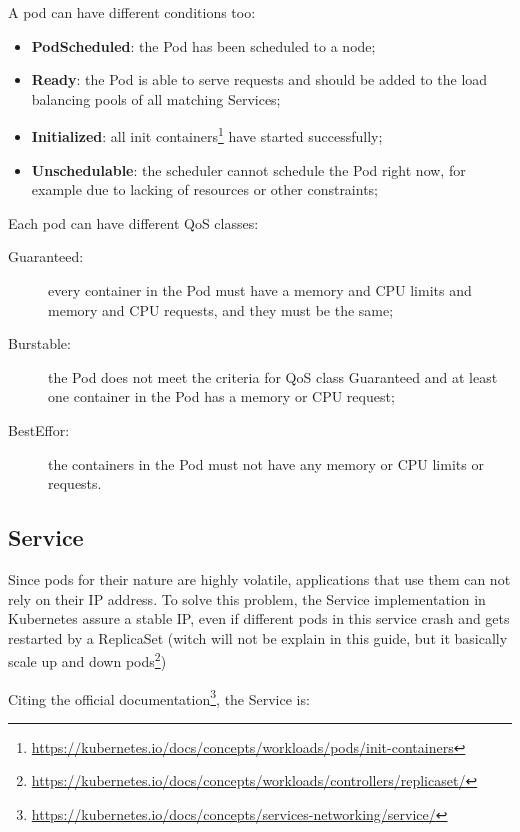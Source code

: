 A pod can have different conditions too:
\begin{itemize}
\item \textbf{PodScheduled}: the Pod has been scheduled to a node;
\item \textbf{Ready}: the Pod is able to serve requests and should be added
  to the load balancing pools of all matching Services;
\item \textbf{Initialized}: all init containers\footnote{
  \url{https://kubernetes.io/docs/concepts/workloads/pods/init-containers}}
  have started successfully;
\item \textbf{Unschedulable}: the scheduler cannot schedule the Pod right
  now, for example due to lacking of resources or other constraints;
\end{itemize}

Each pod can have different QoS classes:
\begin{description}
  \item [Guaranteed:] every container in the Pod must have a memory and CPU
  limits and memory and CPU requests, and they must be the same;
  \item [Burstable:] the Pod does not meet the criteria for QoS class
  Guaranteed and at least one container in the Pod has a memory or CPU request;
  \item [BestEffor:] the containers in the Pod must not have any memory or CPU
  limits or requests.
\end{description}

\subsection{Service}\label{service}

Since pods for their nature are highly volatile, applications that use
them can not rely on their IP address. To solve this problem, the
Service implementation in Kubernetes assure a stable IP, even if
different pods in this service crash and gets restarted by a ReplicaSet
(witch will not be explain in this guide, but it basically scale up and
down pods\footnote{
\url{https://kubernetes.io/docs/concepts/workloads/controllers/replicaset/}})

Citing the official documentation\footnote{
\url{https://kubernetes.io/docs/concepts/services-networking/service/}}, the
Service is:\\


